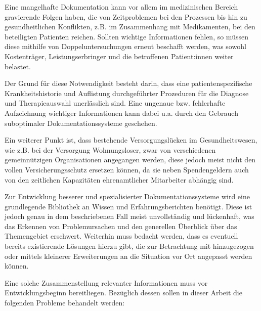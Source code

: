 Eine mangelhafte Dokumentation kann vor allem im medizinischen Bereich gravierende Folgen haben, die von Zeitproblemen bei den Prozessen bis hin zu gesundheitlichen Konflikten, z.B. im Zusammenhang mit Medikamenten, bei den beteiligten Patienten reichen. \citep[vgl.]{Silvestre.2017} Sollten wichtige Informationen fehlen, so müssen diese mithilfe von Doppeluntersuchungen erneut beschafft werden, was sowohl Kostenträger, Leistungserbringer und die betroffenen Patient:innen weiter belastet.

Der Grund für diese Notwendigkeit besteht darin, dass eine patientenspezifische Krankheitshistorie und Auflistung durchgeführter Prozeduren für die Diagnose und Therapieauswahl unerlässlich sind. Eine ungenaue bzw. fehlerhafte Aufzeichnung wichtiger Informationen kann dabei u.a. durch den Gebrauch suboptimaler Dokumentationssysteme geschehen. 

Ein weiterer Punkt ist, dass bestehende Versorgungslücken im Gesundheitswesen, wie z.B. bei der Versorgung Wohnungsloser, zwar von verschiedenen gemeinnützigen Organisationen angegangen werden, diese jedoch meist nicht den vollen Versicherungsschutz ersetzen können, da sie neben Spendengeldern auch von den zeitlichen Kapazitäten ehrenamtlicher Mitarbeiter abhängig sind. \citep[S. 6]{Zanders.2022}

Zur Entwicklung besserer und spezialisierter Dokumentationssysteme wird eine grundlegende Bibliothek an Wissen und Erfahrungsberichten benötigt. Diese ist jedoch genau in dem beschriebenen Fall meist unvollständig und lückenhaft, was das Erkennen von Problemursachen und den generellen Überblick über das Themengebiet erschwert. Weiterhin muss bedacht werden, dass es eventuell bereits existierende Lösungen hierzu gibt, die zur Betrachtung mit hinzugezogen oder mittels kleinerer Erweiterungen an die Situation vor Ort angepasst werden können. 

Eine solche Zusammenstellung relevanter Informationen muss vor Entwicklungsbeginn bereitliegen. Bezüglich dessen sollen in dieser Arbeit die folgenden Probleme behandelt werden:

